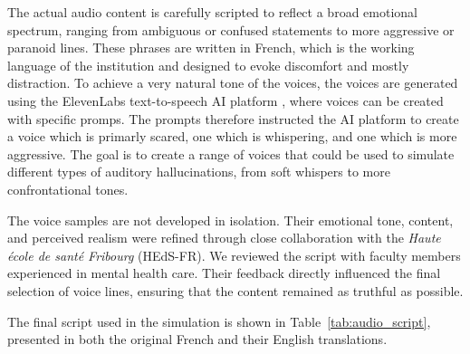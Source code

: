\vspace{1em}
The actual audio content is carefully scripted to reflect a broad emotional spectrum, ranging from ambiguous or confused statements to more aggressive or paranoid lines. These phrases are written in French, which is the working language of the institution and designed to evoke discomfort and mostly distraction. To achieve a very natural tone of the voices, the voices are generated using the ElevenLabs text-to-speech AI platform \cite{elevenlabs}, where voices can be created with specific promps. The prompts therefore instructed the AI platform to create a voice which is primarly scared, one which is whispering, and one which is more aggressive. The goal is to create a range of voices that could be used to simulate different types of auditory hallucinations, from soft whispers to more confrontational tones.

The voice samples are not developed in isolation. Their emotional tone, content, and perceived realism were refined through close collaboration with the \textit{Haute école de santé Fribourg} (HEdS-FR). We reviewed the script with faculty members experienced in mental health care. Their feedback directly influenced the final selection of voice lines, ensuring that the content remained as truthful as possible. 

\vspace{1em}
The final script used in the simulation is shown in Table~\ref{tab:audio_script}, presented in both the original French and their English translations.

